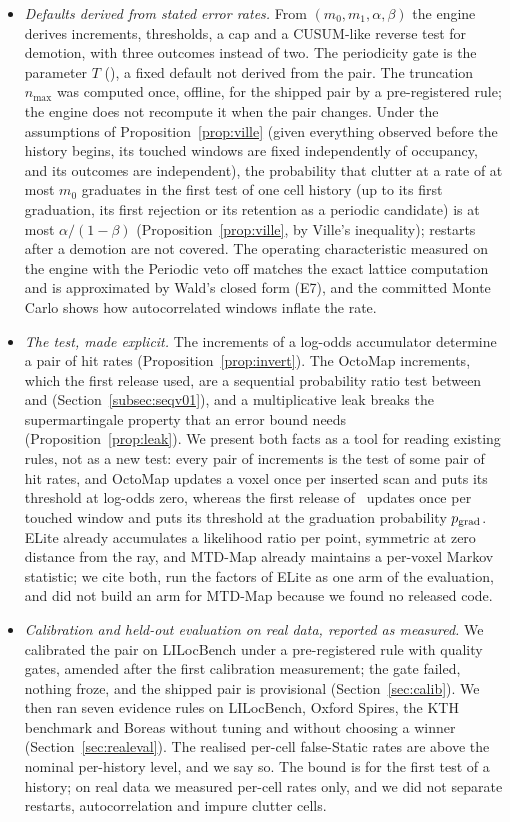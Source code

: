 \begin{itemize}
  \item \emph{Defaults derived from stated error rates.} From $(m_0,m_1,\alpha,\beta)$ the engine derives increments, thresholds, a cap and a CUSUM-like reverse test for demotion, with three outcomes instead of two. The periodicity gate is the parameter $T$ (), a fixed default not derived from the pair. The truncation $n_{\max}$ was computed once, offline, for the shipped pair by a pre-registered rule; the engine does not recompute it when the pair changes. Under the assumptions of Proposition~\ref{prop:ville} (given everything observed before the history begins, its touched windows are fixed independently of occupancy, and its outcomes are independent), the probability that clutter at a rate of at most $m_0$ graduates in the first test of one cell history (up to its first graduation, its first rejection or its retention as a periodic candidate) is at most $\alpha/(1-\beta)$ (Proposition~\ref{prop:ville}, by Ville's inequality); restarts after a demotion are not covered. The operating characteristic measured on the engine with the Periodic veto off matches the exact lattice computation and is approximated by Wald's closed form (E7), and the committed Monte Carlo shows how autocorrelated windows inflate the rate.
  \item \emph{The test, made explicit.} The increments of a log-odds accumulator determine a pair of hit rates (Proposition~\ref{prop:invert}). The OctoMap increments, which the first release used, are a sequential probability ratio test between \SqLegMzero{} and \SqLegMone{} (Section~\ref{subsec:seqv01}), and a multiplicative leak breaks the supermartingale property that an error bound needs (Proposition~\ref{prop:leak}). We present both facts as a tool for reading existing rules, not as a new test: every pair of increments is the test of some pair of hit rates, and OctoMap updates a voxel once per inserted scan and puts its threshold at log-odds zero, whereas the first release of \sname\ updates once per touched window and puts its threshold at the graduation probability $p_{\mathrm{grad}}$. ELite \citep{gil2025elite} already accumulates a likelihood ratio per point, symmetric at zero distance from the ray, and MTD-Map \citep{kim2026mtdmap} already maintains a per-voxel Markov statistic; we cite both, run the factors of ELite as one arm of the evaluation, and did not build an arm for MTD-Map because we found no released code.
  \item \emph{Calibration and held-out evaluation on real data, reported as measured.} We calibrated the pair on LILocBench under a pre-registered rule with quality gates, amended after the first calibration measurement; the gate failed, nothing froze, and the shipped pair is provisional (Section~\ref{sec:calib}). We then ran seven evidence rules on LILocBench, Oxford Spires, the KTH benchmark and Boreas without tuning and without choosing a winner (Section~\ref{sec:realeval}). The realised per-cell false-Static rates are above the nominal per-history level, and we say so. The bound is for the first test of a history; on real data we measured per-cell rates only, and we did not separate restarts, autocorrelation and impure clutter cells.

\end{itemize}
